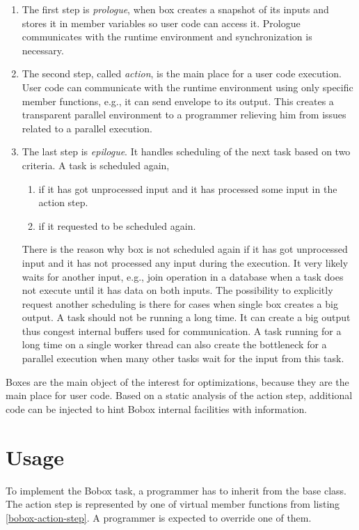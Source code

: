 \begin{enumerate}
\item The first step is \emph{prologue}, when box creates a snapshot of its inputs and stores it in member variables so user code can access it. Prologue communicates with the runtime environment and synchronization is necessary.
\item The second step, called \emph{action}, is the main place for a user code execution. User code can communicate with the runtime environment using only specific member functions, e.g., it can send envelope to its output. This creates a transparent parallel environment to a programmer relieving him from issues related to a parallel execution.
\item The last step is \emph{epilogue}. It handles scheduling of the next task based on two criteria. A task is scheduled again,

\begin{enumerate}
\item if it has got unprocessed input and it has processed some input in the action step.
\item if it requested to be scheduled again.
\end{enumerate}

There is the reason why box is not scheduled again if it has got unprocessed input and it has not processed any input during the execution. It very likely waits for another input, e.g., join operation in a database when a task does not execute until it has data on both inputs. The possibility to explicitly request another scheduling is there for cases when single box creates a big output. A task should not be running a long time. It can create a big output thus congest internal buffers used for communication. A task running for a long time on a single worker thread can also create the bottleneck for a parallel execution when many other tasks wait for the input from this task.

\end{enumerate}

Boxes are the main object of the interest for optimizations, because they are the main place for user code. Based on a static analysis of the action step, additional code can be injected to hint Bobox internal facilities with information.

\section{Usage}
\label{bobox-usage}
To implement the Bobox task, a programmer has to inherit from the  base class. The action step is represented by one of virtual member functions from listing \ref{bobox-action-step}. A programmer is expected to override one of them.

